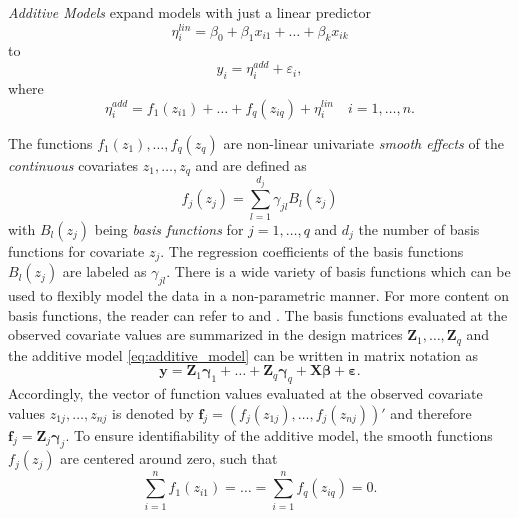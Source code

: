 
\textit{Additive Models} \citep{fahrmeir2003regression} expand models with just a linear predictor  
\begin{equation}
\eta_{i}^{lin} = \beta_{0}+\beta_{1} x_{i1}+\ldots+\beta_{k} x_{i k}
\end{equation}
to 
\begin{equation}
y_{i} = \eta_{i}^{add} + \varepsilon_{i} ,
\label{eq:additive_model}
\end{equation}
where 
\begin{equation}
\eta_{i}^{a d d}=f_{1}\left(z_{i 1}\right)+\ldots+f_{q}\left(z_{i q}\right)+\eta_{i}^{l i n} \quad i = 1, \ldots, n.
\end{equation}

The functions $f_{1}(z_{1}), \ldots, f_{q}(z_{q})$ are non-linear univariate \textit{smooth effects} of the \textit{continuous} covariates $z_1, \ldots, z_q$ and are defined as
\begin{equation}
f_{j}\left(z_{j}\right)=\sum_{l=1}^{d_{j}} \gamma_{j l} B_{l}\left(z_{j}\right)
\end{equation}
with $B_{l}\left(z_{j}\right)$ being \textit{basis functions} for $j = 1, \ldots, q$ and $d_j$ the number of basis functions for covariate $z_j$. The regression coefficients of the basis functions $B_l(z_j)$ are labeled as $\gamma_{jl}$. There is a wide variety of basis functions which can be used to flexibly model the data in a non-parametric manner. For more content on basis functions, the reader can refer to \cite{wood2017generalized} and \cite{fahrmeir2003regression}. The basis functions evaluated at the observed covariate values are summarized in the design matrices $\bm{Z}_1, \ldots, \bm{Z}_q$ and the additive model \ref{eq:additive_model} can be written in matrix notation as
\begin{equation}
\bm{y} = \bm{Z}_1 \bm{\gamma}_1 + \ldots + \bm{Z}_q \bm{\gamma}_q + \bm{X} \bm{\beta} + \bm{\varepsilon}.
\label{eq:gam_matrix_notation}
\end{equation}
Accordingly, the vector of function values evaluated at the observed covariate values $z_{1j}, \ldots, z_{nj}$ is denoted by $\bm{f}_j = (f_j(z_{1j}), \ldots, f_j(z_{nj}))' $ and therefore $\bm{f}_j = \bm{Z}_j \bm{\gamma}_j$. To ensure identifiability of the additive model, the smooth functions $f_j(z_j)$ are centered around zero, such that
\begin{equation}
\sum_{i=1}^{n} f_{1}\left(z_{i 1}\right)=\ldots=\sum_{i=1}^{n} f_{q}\left(z_{i q}\right)=0.
\end{equation}


